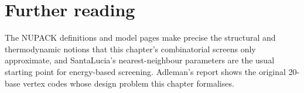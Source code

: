 \section*{Further reading}
The NUPACK definitions and model pages make precise the structural and
thermodynamic notions that this chapter's combinatorial screens only
approximate,\cite{NUPACKmodel,Zadeh2011} and SantaLucia's nearest-neighbour
parameters are the usual starting point for energy-based screening.\cite{SantaLucia1998}
Adleman's report shows the original 20-base vertex codes whose design problem
this chapter formalises.\cite{Adleman1994}
